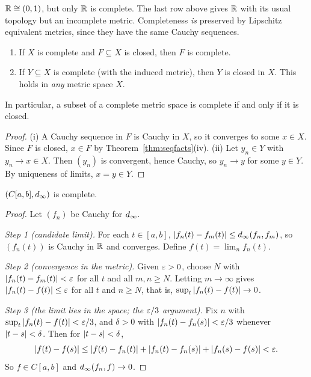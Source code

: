 \begin{warning}
$\mathbb{R}\cong(0,1)$, but only $\mathbb{R}$ is complete. The last row above gives $\mathbb{R}$ with its usual topology but an incomplete metric. Completeness \emph{is} preserved by Lipschitz equivalent metrics, since they have the same Cauchy sequences.
\end{warning}

\begin{theorem}\label{thm:closedcomplete}
\leavevmode
\begin{enumerate}[label=(\roman*)]
  \item If $X$ is complete and $F\subseteq X$ is closed, then $F$ is complete.
  \item If $Y\subseteq X$ is complete (with the induced metric), then $Y$ is closed in $X$. This holds in \emph{any} metric space $X$.
\end{enumerate}
In particular, a subset of a complete metric space is complete if and only if it is closed.
\end{theorem}
\begin{proof}
(i) A Cauchy sequence in $F$ is Cauchy in $X$, so it converges to some $x\in X$. Since $F$ is closed, $x\in F$ by Theorem~\ref{thm:seqfacts}(iv).
(ii) Let $y_n\in Y$ with $y_n\to x\in X$. Then $(y_n)$ is convergent, hence Cauchy, so $y_n\to y$ for some $y\in Y$. By uniqueness of limits, $x=y\in Y$.
\end{proof}

\begin{theorem}\label{thm:Cabcomplete}
$(C[a,b],d_\infty)$ is complete.
\end{theorem}
\begin{proof}
Let $(f_n)$ be Cauchy for $d_\infty$.

\emph{Step 1 (candidate limit).} For each $t\in[a,b]$, $\left\lvert f_n(t)-f_m(t)\right\rvert\le d_\infty(f_n,f_m)$, so $(f_n(t))$ is Cauchy in $\mathbb{R}$ and converges. Define $f(t)=\lim_n f_n(t)$.

\emph{Step 2 (convergence in the metric).} Given $\varepsilon>0$, choose $N$ with $\left\lvert f_n(t)-f_m(t)\right\rvert<\varepsilon$ for all $t$ and all $m,n\ge N$. Letting $m\to\infty$ gives $\left\lvert f_n(t)-f(t)\right\rvert\le\varepsilon$ for all $t$ and $n\ge N$, that is, $\sup_t\left\lvert f_n(t)-f(t)\right\rvert\to0$.

\emph{Step 3 (the limit lies in the space; the $\varepsilon/3$ argument).} Fix $n$ with $\sup_t\left\lvert f_n(t)-f(t)\right\rvert<\varepsilon/3$, and $\delta>0$ with $\left\lvert f_n(t)-f_n(s)\right\rvert<\varepsilon/3$ whenever $\left\lvert t-s\right\rvert<\delta$. Then for $\left\lvert t-s\right\rvert<\delta$,
\[
  \left\lvert f(t)-f(s)\right\rvert\le\left\lvert f(t)-f_n(t)\right\rvert+\left\lvert f_n(t)-f_n(s)\right\rvert+\left\lvert f_n(s)-f(s)\right\rvert<\varepsilon .
\]
So $f\in C[a,b]$ and $d_\infty(f_n,f)\to0$.
\end{proof}

